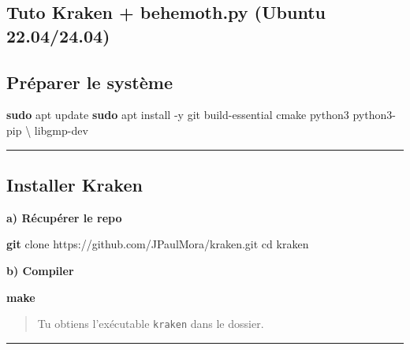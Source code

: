 \documentclass[
  french,
]{article}
\newenvironment{Shaded}{\begin{snugshade}}{\end{snugshade}}
\newcommand{\AttributeTok}[1]{\textcolor[rgb]{0.13,0.29,0.53}{#1}}
\newcommand{\BuiltInTok}[1]{#1}
\newcommand{\DataTypeTok}[1]{\textcolor[rgb]{0.13,0.29,0.53}{#1}}
\newcommand{\FunctionTok}[1]{\textcolor[rgb]{0.13,0.29,0.53}{\textbf{#1}}}
\newcommand{\NormalTok}[1]{#1}
\begin{document}
\subsection{Tuto Kraken + behemoth.py (Ubuntu
22.04/24.04)}\label{tuto-kraken-behemoth.py-ubuntu-22.0424.04}

\subsection{Préparer le système}\label{pruxe9parer-le-systuxe8me}

\begin{Shaded}
\begin{Highlighting}[]
\FunctionTok{sudo}\NormalTok{ apt update}
\FunctionTok{sudo}\NormalTok{ apt install }\AttributeTok{{-}y}\NormalTok{ git build{-}essential cmake python3 python3{-}pip }\DataTypeTok{\textbackslash{}}
\NormalTok{    libgmp{-}dev}
\end{Highlighting}
\end{Shaded}

\begin{center}\rule{0.5\linewidth}{0.5pt}\end{center}

\subsection{Installer Kraken}\label{installer-kraken}

\textbf{a) Récupérer le repo}

\begin{Shaded}
\begin{Highlighting}[]
\FunctionTok{git}\NormalTok{ clone https://github.com/JPaulMora/kraken.git}
\BuiltInTok{cd}\NormalTok{ kraken}
\end{Highlighting}
\end{Shaded}

\textbf{b) Compiler}

\begin{Shaded}
\begin{Highlighting}[]
\FunctionTok{make}
\end{Highlighting}
\end{Shaded}

\begin{quote}
Tu obtiens l'exécutable \texttt{kraken} dans le dossier.
\end{quote}

\begin{center}\rule{0.5\linewidth}{0.5pt}\end{center}
\end{document}
